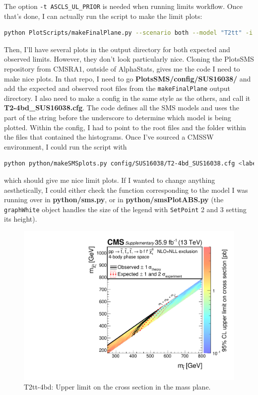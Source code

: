The option \texttt{-t ASCLS\_UL\_PRIOR} is needed when running limits workflow. Once that's done, I can actually run the script to make the limit plots:

\begin{lstlisting}[belowskip=-0.7cm, language=sh, numbers=none]
python PlotScripts/makeFinalPlane.py --scenario both --model "T2tt" -i $OUTDIR -o <output dir for plots> --mode ul --doubleTranspose --addTheory --remake --remakePickle --smooth
\end{lstlisting}

Then, I'll have several plots in the output directory for both expected and observed limits. However, they don't look particularly nice. Cloning the PlotsSMS repository from CMSRA1, outside of AlphaStats, gives me the code I need to make nice plots. In that repo, I need to go \textbf{PlotsSMS/config/SUS16038/} and add the expected and observed root files from the \texttt{makeFinalPlane} output directory. I also need to make a config in the same style as the others, and call it \textbf{T2-4bd\_SUS16038.cfg}. The code defines all the SMS models and uses the part of the string before the underscore to determine which model is being plotted. Within the config, I had to point to the root files and the folder within the files that contained the histograms. Once I've sourced a CMSSW environment, I could run the script with

\begin{lstlisting}[belowskip=-0.7cm, language=sh, numbers=none]
python python/makeSMSplots.py config/SUS16038/T2-4bd_SUS16038.cfg <label - normally model name>
\end{lstlisting}

which should give me nice limit plots. If I wanted to change anything aesthetically, I could either check the function corresponding to the model I was running over in \textbf{python/sms.py}, or in \textbf{python/smsPlotABS.py} (the \texttt{graphWhite} object handles the size of the legend with \texttt{SetPoint} 2 and 3 setting its height).

\begin{figure}[H]
\centering
\includegraphics[width=120mm]{./sec31/T2-4bdXSEC.pdf}
\caption{T2tt-4bd: Upper limit on the cross section in the mass plane.}
\end{figure}

